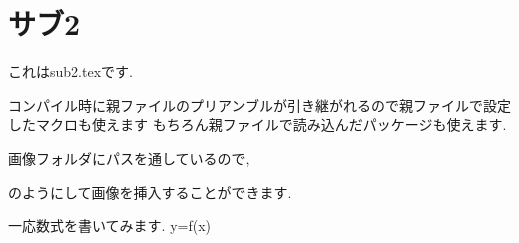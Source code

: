 \documentclass[../master.tex]{subfiles}
\begin{document}
\section{サブ2}
    これはsub2.texです.

    コンパイル時に親ファイルのプリアンブルが引き継がれるので親ファイルで設定したマクロも使えます
    もちろん親ファイルで読み込んだパッケージも使えます.
    \begin{comment}
        コメント環境
    \end{comment}

    画像フォルダにパスを通しているので,
    \begin{figure}[h]
        \centering
    \end{figure}
    のようにして画像を挿入することができます.

    一応数式を書いてみます.
        y=f(x)

%
%
\end{document}
